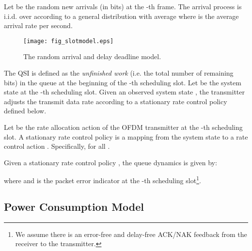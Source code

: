 \documentclass[11pt,journal, onecolumn]{./IEEEtran}
\begin{document}
\begin{Assumption}
 Let  be the random new arrivals (in bits) at the -th frame. The arrival process  is i.i.d. over  according to a general distribution  with average  where  is the average arrival rate per second. ~\hfill\IEEEQED
\end{Assumption}




\begin{figure}[t!]
\centering
\texttt{[image: fig\_slotmodel.eps]}
\caption{The random arrival and delay deadline model.} \label{fig_slotmodel}
\end{figure}



The QSI  is defined as the {\em unfinished work} (i.e. the total number of remaining bits) in the queue at the beginning of the -th scheduling slot. Let  be the system state at the -th scheduling slot. Given an observed system state , the transmitter adjusts the transmit data rate according to a stationary rate control policy defined below.

\begin{Definition}
Let  be the rate allocation action of the OFDM transmitter at the -th scheduling slot. A stationary rate control policy  is a mapping from the system state  to a rate control action . Specifically,  for all . ~\hfill\IEEEQED
\end{Definition}


Given a stationary rate control policy , the queue dynamics is given by:

where  and  is the packet error indicator at the -th scheduling slot\footnote{We assume there is an error-free and delay-free ACK/NAK feedback from the receiver to the transmitter.}.

\subsection{Power Consumption Model}
\end{document}
